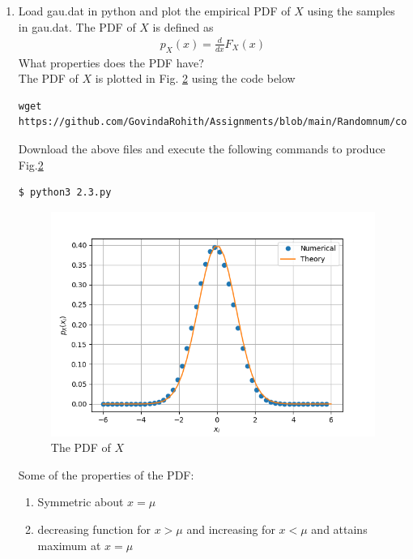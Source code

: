 \documentclass[journal,12pt,twocolumn]{IEEEtran}
\begin{document}
\begin{enumerate}[label=\thesection.\arabic*
,ref=\thesection.\theenumi]
\begin{figure}[!h]
\caption{The CDF of $X$}
\label{fig:2.2}
\end{figure}
Some of the properties of CDF 
\begin{enumerate}
    \item $F_X(x)$ is non decreasing function.
    \item Symmetric about one point.
\end{enumerate}
\item
Load gau.dat in python and plot the empirical PDF of $X$ using the samples in gau.dat. The PDF of $X$ is defined as
\begin{align}
p_{X}(x) = \frac{d}{dx}F_{X}(x)
\end{align}
What properties does the PDF have?
\\
\solution The PDF of $X$ is plotted in Fig. \ref{fig:2.3} using the code below
\begin{lstlisting}
wget https://github.com/GovindaRohith/Assignments/blob/main/Randomnum/codes/2.3.py
\end{lstlisting}
Download the above files and execute the following commands to produce Fig.\ref{fig:2.3}
\begin{lstlisting}
$ python3 2.3.py
\end{lstlisting}
\begin{figure}[!h]
\centering
\includegraphics[width=\columnwidth]{./figs/2.3.png}
\caption{The PDF of $X$}
\label{fig:2.3}
\end{figure}
Some of the properties of the PDF:
\begin{enumerate}
    \item Symmetric about $x=\mu$
    \item decreasing function for $x>\mu$ and increasing for $x<\mu$ and attains maximum at $x=\mu$

\end{enumerate}
\end{enumerate}
\end{document}
